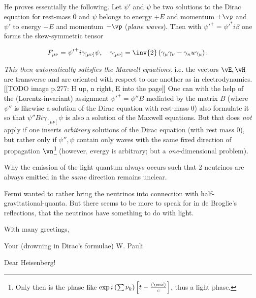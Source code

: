 \documentclass{article}
\newcommand{\nc}[2]{
  \newcommand{#1}{#2}
}
\newcommand{\uequ}[1]{
\begin{align*}
#1
\end{align*}
}
\begin{document}
He proves essentially the following. Let $\psi'$ and $\psi$ be two solutions to the Dirac equation for rest-mass $0$ and $\psi$ belongs to energy $+E$ and momentum $+\vp$ and $\psi'$ to energy $-E$ and momentum $-\vp$ (\textit{plane waves}). Then with ${\psi'}^+ = {\psi'}^* i \beta$ one forms the skew-symmetric tensor
\uequ{
F_{\mu\nu} = {\psi'}^+ i\gamma_{[\mu\nu]}\psi, \quad
\gamma_{[\mu\nu]} = \inv{2}\left(\gamma_\mu \gamma_\nu - \gamma_nu \gamma_\mu \right).
}
\textit{This then automatically satisfies the Maxwell equations}. i.e. the vectors $\vE,\vH$ are transverse and are oriented with respect to one another as in electrodynamics.
[[TODO image p.277: H up, n right, E into the page]]
One can with the help of the (Lorentz-invariant) assignment ${\psi'}^+ = \psi'' B$ mediated by the matrix $B$ (where $\psi''$ is likewise a solution of the Dirac equation with rest-mass $0$) also formulate it so that $\psi'' B i \gamma_{[\mu\nu]}\psi$ is also a solution of the Maxwell equations. But that does \textit{not} apply if one inserts \textit{arbitrary} solutions of the Dirac equation (with rest mass $0$), but rather only if $\psi'',\psi$ contain only waves with the same fixed direction of propagation $\vn$\footnote{Only then is the phase like $\exp{i\left(\sum\nu_k\right)\left[t-\frac{(\vn \vec{x})}{c}\right]}$, thus a light phase.} (however, evergy is arbitrary; but a \textit{one}-dimensional problem).

Why the emission of the light quantum always occurs such that 2 neutrinos are always emitted in the \textit{same} direction remains unclear.

Fermi wanted to rather bring the neutrinos into connection with half-gravitational-quanta. But there seems to be more to speak for in de Broglie's reflections, that the neutrinos have something to do with light.

With many greetings,

Your (drowning in Dirac's formulae) W. Pauli

\date{February 7, 1934}

\nc{\vi}{\vec{i}}

Dear Heisenberg!
\end{document}
